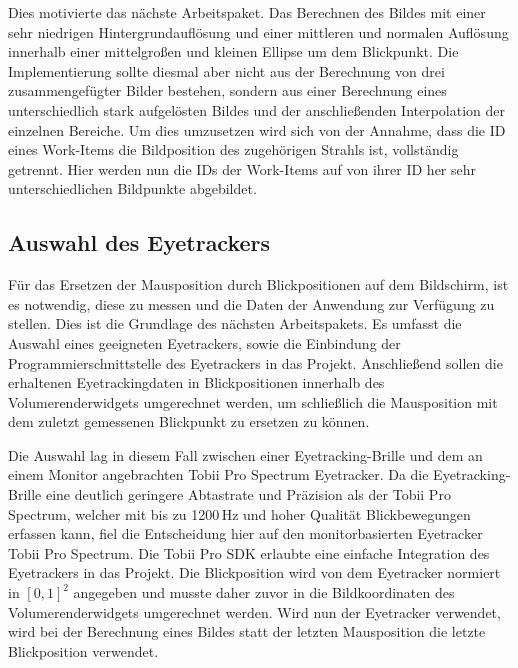 Dies motivierte das nächste Arbeitspaket.
Das Berechnen des Bildes mit einer sehr niedrigen Hintergrundauflösung und einer mittleren und normalen Auflösung innerhalb einer mittelgroßen und kleinen Ellipse um dem Blickpunkt.
Die Implementierung sollte diesmal aber nicht aus der Berechnung von drei zusammengefügter Bilder bestehen, sondern aus einer Berechnung eines unterschiedlich stark aufgelösten Bildes und der anschließenden Interpolation der einzelnen Bereiche.
Um dies umzusetzen wird sich von der Annahme, dass die ID eines Work-Items die Bildposition des zugehörigen Strahls ist, vollständig getrennt.
Hier werden nun die IDs der Work-Items auf von ihrer ID her sehr unterschiedlichen Bildpunkte abgebildet.


\subsection{Auswahl des Eyetrackers}
Für das Ersetzen der Mausposition durch Blickpositionen auf dem Bildschirm, ist es notwendig, diese zu messen und die Daten der Anwendung zur Verfügung zu stellen.
Dies ist die Grundlage des nächsten Arbeitspakets.
Es umfasst die Auswahl eines geeigneten Eyetrackers, sowie die Einbindung der Programmierschnittstelle des Eyetrackers in das Projekt.
Anschließend sollen die erhaltenen Eyetrackingdaten in Blickpositionen innerhalb des Volumerenderwidgets umgerechnet werden, um schließlich die Mausposition mit dem zuletzt gemessenen Blickpunkt zu ersetzen zu können.

Die Auswahl lag in diesem Fall zwischen einer Eyetracking-Brille und dem an einem Monitor angebrachten Tobii Pro Spectrum Eyetracker.
Da die Eyetracking-Brille eine deutlich geringere Abtastrate und Präzision als der Tobii Pro Spectrum, welcher mit bis zu 1200\,Hz und hoher Qualität Blickbewegungen erfassen kann, fiel die Entscheidung hier auf den monitorbasierten Eyetracker Tobii Pro Spectrum.
Die Tobii Pro SDK erlaubte eine einfache Integration des Eyetrackers in das Projekt.
Die Blickposition wird von dem Eyetracker normiert in $[0,1]^2$ angegeben und musste daher zuvor in die Bildkoordinaten des Volumerenderwidgets umgerechnet werden.
Wird nun der Eyetracker verwendet, wird bei der Berechnung eines Bildes statt der letzten Mausposition die letzte Blickposition verwendet.

